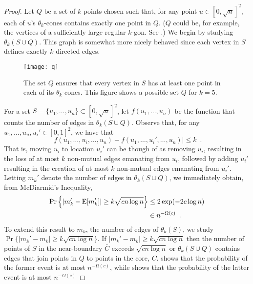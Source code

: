 \documentclass[twoside,leqno,twocolumn]{article}
\begin{document}
\begin{proof}
Let $Q$ be a set of $k$ points chosen such that, for any point
$u\in[0,\sqrt{n}]^2$, each of $u$'s $\theta_k$-cones contains exactly
one point in $Q$. ($Q$ could be, for example, the vertices of a
sufficiently large regular $k$-gon. See .)  We begin by studying
$\theta_k(S\cup Q)$.  This graph is somewhat more nicely behaved since
each vertex in $S$ defines exactly $k$ directed edges.

\begin{figure*}
  \begin{center}
    \texttt{[image: q]}
  \end{center}
  \caption{The set $Q$ ensures that every vertex in $S$ has at least
    one point in each of its $\theta_k$-cones.  This figure shows a
    possible set $Q$ for $k=5$.}
\end{figure*}

For a set $S=\{u_1,\ldots,u_n\}\subset [0,\sqrt{n}]^2$, let
$f(u_1,\ldots,u_n)$ be the function that counts the number of edges
in $\theta_k(S\cup Q)$.  Observe that, for any $u_1,\ldots,u_n,u_i'\in
[0,1]^2$, we have that
\[
   |f(u_1,\ldots,u_i,\ldots,u_n)-f(u_1,\ldots,u_i',\ldots,u_n)| \le k \enspace .
\]
That is, moving $u_i$ to location $u_i'$ can be though of as removing
$u_i$, resulting in the loss of at most $k$ non-mutual edges emanating
from $u_i$, followed by adding $u_i'$ resulting in the creation of at
most $k$ non-mutual edges emanating from $u_i'$.  Letting $m_k'$ denote
the number of edges in $\theta_k(S\cup Q)$, we immediately obtain,
from McDiarmid's Inequality,
\begin{align*}
   \Pr\left\{\left|m_k'-\mathrm{E}[m_k']\right| \ge k\sqrt{cn\log n}\right\}  
       & \le 2\exp(-2c\log n) \\
       & \in n^{-\Omega(c)} \enspace .
\end{align*}
To extend this result to $m_k$, the number of edges of $\theta_k(S)$,
we study $\Pr\{|m_k' - m_k|\ge k\sqrt{cn\log n}\}$.  If $|m_k' - m_k|\ge
k\sqrt{cn\log n}$ then the number of points of $S$ in the near-boundary
$\bar{C}$ exceeds $\sqrt{cn\log n}$ or $\theta_k(S\cup Q)$ contains
edges that join points in $Q$ to points in the core, $C$.
 shows that the probability of the former event is at most
$n^{-\Omega(c)}$, while  shows that the probability of
the latter event is at most $n^{-\Omega(c)}$
\end{proof}
\end{document}
